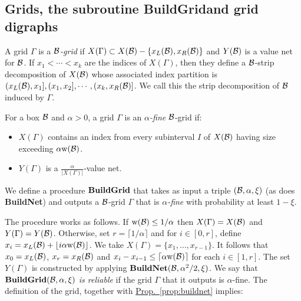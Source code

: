 \documentclass{acmsmall}
\newcommand{\cB}{{\cal B}}
\newcommand{\Fig}[1]{\hyperref[fig:#1]{Fig.\,\ref*{fig:#1}}} %
\newcommand{\Prop}[1]{\hyperref[prop:#1]{Prop.~\ref*{prop:#1}}} %
\newcommand{\width}{{\bf {\rm  w}}}
\newcommand{\griderror}{\xi}
\newcommand{\gridprec}{\alpha}
\newcommand{\netprec}{\alpha}
\newcommand{\buildgrid}{{\rm {\bf BuildGrid}}}
\newcommand{\buildnet}{{\rm {\bf BuildNet}}}
\begin{document}

\subsection{Grids, the subroutine \buildgrid and grid digraphs}
\label{subsec:grids}

A grid $\Gamma$ is a {\em $\cB$-grid} if $X(\Gamma) \subset X(\cB)-\{x_L(\cB),x_R(\cB)\}$ and
$Y(\cB)$ is a value net for $\cB$. If $x_1<\cdots<x_k$ are the indices of $X(\Gamma)$, then
they define a $\cB$-strip decomposition  of $X(\cB)$ whose associated index partition is $(x_L(\cB),x_1],(x_1,x_2],\cdots,(x_k,x_R(\cB)]$.
We call this the strip decomposition of $\cB$ induced by $\Gamma$.

\begin{definition} \label{def:fine}
For a box $\cB$ and $\gridprec>0$, a grid $\Gamma$ is an {\em $\gridprec$-fine} $\cB$-grid if:

\begin{itemize}
\item $X(\Gamma)$ contains an index from every subinterval $I$ of  $X(\cB)$ having size exceeding $\gridprec \width(\cB)$.
\item $Y(\Gamma)$ is a $\frac{\gridprec}{|X(\Gamma)|}$-value net.
\end{itemize}
\end{definition}

We define a procedure $\buildgrid{}$ that  takes as input a triple $(\cB,\gridprec,\griderror)$ (as does
\buildnet)
and outputs a $\cB$-grid $\Gamma$ that is {\em $\gridprec$-fine} with probability at least $1-\griderror$.  

The procedure works as follows.
If $\width(\cB) \leq 1/\gridprec$ then $X(\Gamma)=X(\cB)$ and $Y(\Gamma)=Y(\cB)$. Otherwise, set $r= \lceil 1/\gridprec \rceil$ and for $i \in [0,r]$, define
$x_i=x_L(\cB) + \lfloor i \gridprec  \width(\cB) \rfloor$.  We take $X(\Gamma)=\{x_1,\ldots,x_{r-1}\}$.
It follows that $x_0=x_L(\cB)$, $x_r=x_R(\cB)$ and  $x_i-x_{i-1} \leq \lceil \gridprec \width(\cB) \rceil$ for each $i \in [1,r]$. 
The set $Y(\Gamma)$ is constructed by applying $\buildnet(\cB,\gridprec^2/2,\griderror)$.  
We say that  $\buildgrid(\cB,\gridprec,\griderror)$ {\em is reliable} if the grid $\Gamma$ that it outputs is
$\gridprec$-fine.  The definition of the grid, together with  \Prop{buildnet} implies:
\end{document}

